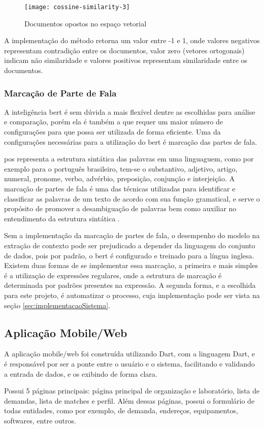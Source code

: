 \begin{figure}[htb]
    \caption{Documentos opostos no espaço vetorial}
    \texttt{[image: cossine-similarity-3]}
    \label{fig:cossine_similarity_3}
\end{figure}

A implementação do método retorna um valor entre -1 e 1, onde valores negativos representam contradição entre os documentos, valor zero (vetores ortogonais) indicam não similaridade e valores positivos representam similaridade entre os documentos.

\subsubsection{Marcação de Parte de Fala}\label{subsubsec:pos_tagging}

A inteligência \gls{bert} é sem dúvida a mais flexível dentre as escolhidas para análise e comparação, porém ela é também a que requer um maior número de configurações para que possa ser utilizada de forma eficiente. Uma da configurações necessárias para a utilização do \gls{bert} é marcação das partes de fala.

\gls{pos} representa a estrutura sintática das palavras em uma linguaguem, como por exemplo para o português brasileiro, tem-se o substantivo, adjetivo, artigo, numeral, pronome, verbo, advérbio, preposição, conjunção e interjeição. A marcação de partes de fala é uma das técnicas utilizadas para identificar e classificar as palavras de um texto de acordo com sua função gramatical, e serve o propósito de promover a desambiguação de palavras bem como auxiliar no entendimento da estrutura sintática \cite{JurafskyMartin2024}.

Sem a implementação da marcação de partes de fala, o desempenho do modelo na extração de contexto pode ser prejudicado a depender da linguagem do conjunto de dados, pois por padrão, o \gls{bert} é configurado e treinado para a língua inglesa. Existem duas formas de se implementar essa marcação, a primeira e mais simples é a utilização de expressões regulares, onde a estrutura de marcação é determinada por padrões presentes na expressão. A segunda forma, e a escolhida para este projeto, é automatizar o processo, cuja implementação pode ser vista na seção \ref{sec:implementacaoSistema}.

\subsection{Aplicação Mobile/Web}\label{subsec:app}

A aplicação mobile/web foi construída utilizando Dart, com a linguagem Dart, e é responsável por ser a ponte entre o usuário e o sistema, facilitando e validando a entrada de dados, e os exibindo de forma clara.

Possui 5 páginas principais: página principal de organização e laboratório, lista de demandas, lista de matches e perfil. Além dessas páginas, possui o formulário de todas entidades, como por exemplo, de demanda, endereços, equipamentos, softwares, entre outros.